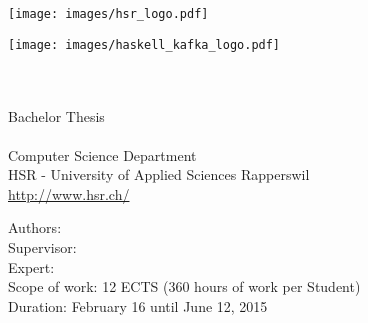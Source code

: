 \begin{titlepage}
\begin{flushleft}

\begin{center}
\begin{minipage}[t]{0.45\textwidth}
  \texttt{[image: images/hsr\_logo.pdf]}
\end{minipage}
\begin{minipage}[t]{0.45\textwidth}
 \hspace{\fill}
 \texttt{[image: images/haskell\_kafka\_logo.pdf]}
\end{minipage}
\end{center}
\noindent\begin{minipage}[t]{0.49\textwidth}
  \begin{flushleft}
    \vspace{0pt} %
  \end{flushleft}
\end{minipage}
\hfill
\begin{minipage}[t]{0.49\textwidth}
  \begin{flushright}
    \vspace{0pt} %
  \end{flushright}
\end{minipage}
\\[4cm]

{\huge \bfseries \TITLE}\\[2.5cm]

Bachelor Thesis \\
\SEMESTER \\
Computer Science Department \\
HSR - University of Applied Sciences Rapperswil \\
\url{http://www.hsr.ch/}\\[2cm]


\vfill

Authors: \AUTHOR \\
Supervisor: \SUPERVISOR \\
Expert: \EXPERT \\
Scope of work: 12 ECTS (360 hours of work per Student) \\
Duration: February 16 until June 12, 2015 \\

\end{flushleft}
\end{titlepage}
